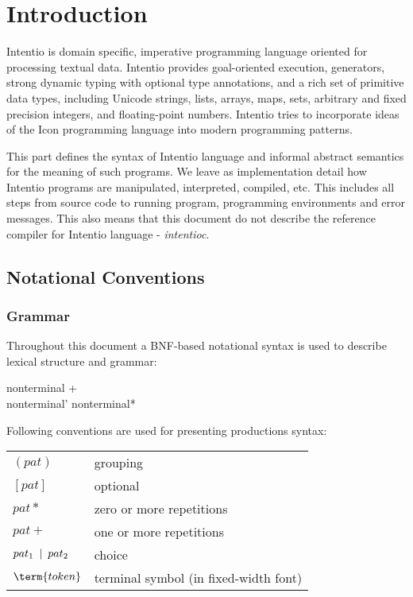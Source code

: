 \chapter{Introduction}

Intentio is domain specific, imperative programming language oriented for processing textual data. Intentio provides goal-oriented execution, generators, strong dynamic typing with optional type annotations, and a rich set of primitive data types, including Unicode strings, lists, arrays, maps, sets, arbitrary and fixed precision integers, and floating-point numbers. Intentio tries to incorporate ideas of the Icon\cite{TheIconProgrammingLanguage} programming language into modern programming patterns.

This part defines the syntax of Intentio language and informal abstract semantics for the meaning of such programs. We leave as implementation detail how Intentio programs are manipulated, interpreted, compiled, etc. This includes all steps from source code to running program, programming environments and error messages. This also means that this document do not describe the reference compiler for Intentio language - \emph{intentioc}\cite{intentioc}.


\section{Notational Conventions}

\subsection*{Grammar}

Throughout this document a BNF-based notational syntax is used to describe lexical structure and grammar:

\begin{bnf}
  nonterminal  \eq {} \gor {}+ \\
  nonterminal' \eq nonterminal*
\end{bnf}

Following conventions are used for presenting productions syntax:

\begin{bnfutils}
\begin{center}
\begin{tabular}[t]{ll}
  \((pat)\)            & grouping \\
  \([pat]\)            & optional \\
  \(pat*\)             & zero or more repetitions \\
  \(pat+\)             & one or more repetitions \\
  \(pat_1 \hskip0.5em\relax | \hskip0.5em\relax pat_2\) & choice \\
  \(\term{token}\)     & terminal symbol (in fixed-width font)
\end{tabular}
\end{center}
\end{bnfutils}

